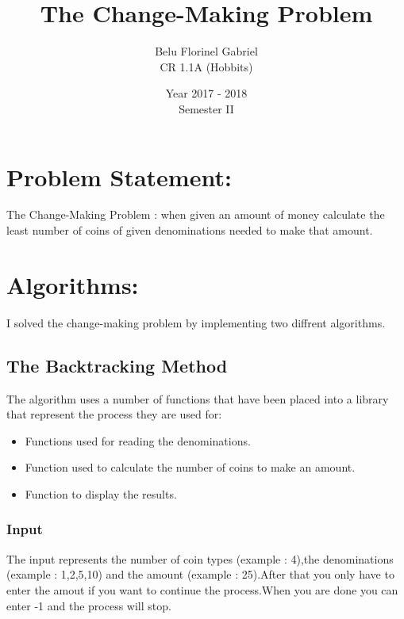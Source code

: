 \documentclass{report}
\title{The Change-Making Problem}
\author{Belu Florinel Gabriel \\ CR 1.1A (Hobbits)}
\date{Year 2017 - 2018 \\ Semester II}
\begin{document}
\begin{titlepage}
\maketitle
\end{titlepage}

\chapter{Problem Statement:}
The Change-Making Problem : when given an amount of money calculate the least number of coins of given denominations needed to make that amount.

\chapter{Algorithms:}
I solved the change-making problem by implementing two diffrent algorithms.

\section*{The Backtracking Method}
The algorithm uses a number of functions that have been placed into a library that represent the process they are used for:
\begin{itemize}
    \item Functions used for reading the denominations.
    \item Function used to calculate the number of coins to make an amount.
    \item Function to display the results.
\end{itemize}

\subsection*{Input}
The input represents the number of coin types (example : 4),the denominations (example : 1,2,5,10) and the amount (example : 25).After that you only have to enter the amout if you want to continue the process.When you are done you can enter -1 and the process will stop.

\newpage
\end{document}
